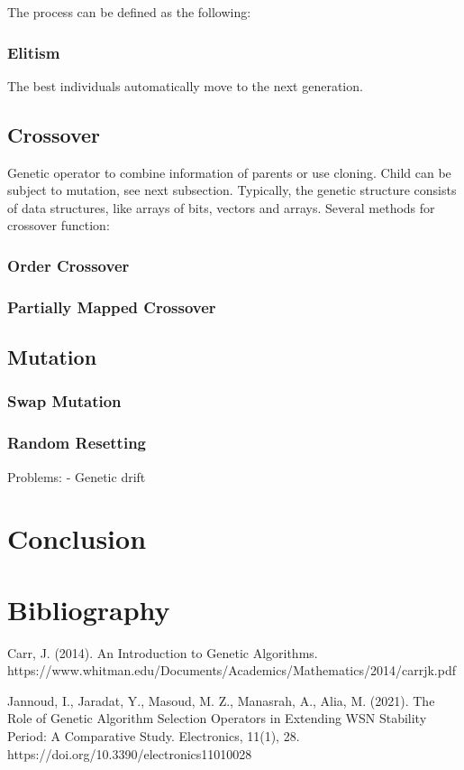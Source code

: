 \documentclass{article}
\begin{document}
The process can be defined as the following:
\

\subsubsection{Elitism}
The best individuals automatically move to the next generation.

\bigskip
\subsection{Crossover}
Genetic operator to combine information of parents or use cloning. Child can be subject to mutation, see next subsection. Typically, the genetic structure consists of data structures, like arrays of bits, vectors and arrays.\smallbreak
Several methods for crossover function:
\subsubsection{Order Crossover}
\subsubsection{Partially Mapped Crossover}

\bigskip
\subsection{Mutation}
\subsubsection{Swap Mutation}
\subsubsection{Random Resetting}
Problems:
- Genetic drift

\newpage
\section{Conclusion}

\newpage
\section{Bibliography}
Carr, J. (2014). An Introduction to Genetic Algorithms.\smallbreak
https://www.whitman.edu/Documents/Academics/Mathematics/2014/carrjk.pdf

Jannoud, I., Jaradat, Y., Masoud, M. Z., Manasrah, A., Alia, M. (2021). The Role of Genetic Algorithm Selection Operators in Extending WSN Stability Period: A Comparative Study. Electronics, 11(1), 28. https://doi.org/10.3390/electronics11010028‌
\end{document}
